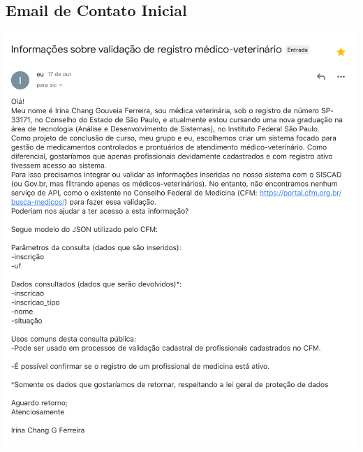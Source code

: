 \documentclass[
    12pt,               %
    openright,          %
    oneside,
    a4paper,            %
    BIBLATEX,           %
    TODO,               %
    english,            %
    brazil              %
    ]{ifsp-spo-inf-ctds}
\begin{document}
\begin{apendicesenv}

\partapendices



\begin {appendices}
\chapter{Email de Contato Inicial}



\includegraphics[page=1, width=1\linewidth,height=0.8\textheight]{Apêndices/email1.PNG}

\newpage
\label{apendiceA}
\end{appendices}


\end{apendicesenv}
\end{document}

